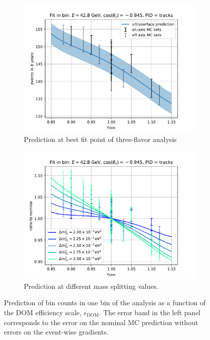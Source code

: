 \begin{figure}
    \centering
    \begin{subfigure}{0.4\linewidth}
        \includegraphics[width=\linewidth]{figures/measurement/systematics/detector/dom_eff_prediction.pdf}
        \caption{Prediction at best fit point of three-flavor analysis}
    \end{subfigure}
    \begin{subfigure}{0.4\linewidth}
        \includegraphics[width=\linewidth]{figures/measurement/systematics/detector/dom_eff_mass_splitting_scan.pdf}
        \caption{Prediction at different mass splitting values.}
    \end{subfigure}
    \caption{Prediction of bin counts in one bin of the analysis as a function of the DOM efficiency scale, $\epsilon_{\mathrm{DOM}}$. The error band in the left panel corresponds to the error on the nominal MC prediction without errors on the event-wise gradients.}
    \label{fig:dom-eff-prediction}
\end{figure}




